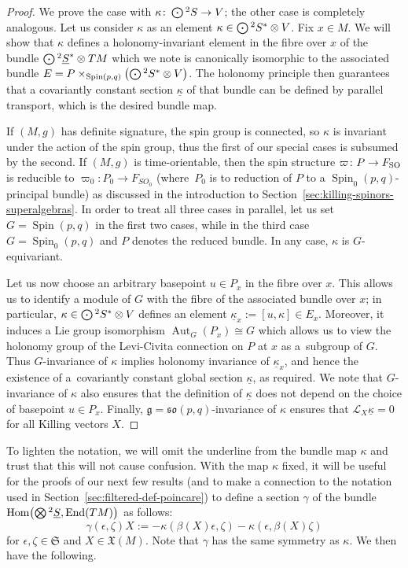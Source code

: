 \documentclass[pdftex]{sigma}
\numberwithin{equation}{section}
\newcommand{\fg}{\mathfrak{g}}
\newcommand{\fso}{\mathfrak{so}}
\newcommand{\fX}{\mathfrak{X}}
\newcommand{\fS}{\mathfrak{S}}
\newcommand{\eL}{\mathscr{L}}
\newcommand{\Sbundle}{\underline{S}}
\newcommand{\Odot}{\mathchoice{{\textstyle\bigodot}}{\bigodot}{\bigodot}{\bigodot}}
\newcommand{\Otimes}{\mathchoice{{\textstyle\bigotimes}}{\bigotimes}{\bigotimes}{\bigotimes}}
\newcommand{\1}{\mathbbm{1}}
\DeclareMathOperator{\End}{End}
\DeclareMathOperator{\Hom}{Hom}
\DeclareMathOperator{\Spin}{Spin}
\DeclareMathOperator{\Aut}{Aut}
\begin{document}
\begin{proof}
	We prove the case with $\kappa\colon \Odot^2S\to V$; the other case is completely analogous. Let us consider $\kappa$ as an element $\kappa\in\Odot^2S^*\otimes V$. Fix $x\in M$. We will show that $\kappa$ defines a holonomy-invariant element in the fibre over $x$ of the bundle $\Odot^2\Sbundle^*\otimes TM$ which we note is canonically isomorphic to the associated bundle $E=P\times_{\Spin(p,q)}\bigl(\Odot^2S^*\otimes V\bigr)$. The holonomy principle then guarantees that a covariantly constant section $\underline\kappa$ of that bundle can be defined by parallel transport, which is the desired bundle map.
	
	If $(M,g)$ has definite signature, the spin group is connected, so $\kappa$ is invariant under the action of the spin group, thus the first of our special cases is subsumed by the second. If $(M,g)$ is time-orientable, then the spin structure $\varpi\colon P\to F_{\rm SO}$ is reducible to $\varpi_0\colon P_0\to F_{SO_0}$ (where~$P_0$ is to reduction of $P$ to a $\Spin_0(p,q)$-principal bundle) as discussed in the introduction to Section~\ref{sec:killing-spinors-superalgebras}. In order to treat all three cases in parallel, let us set $G=\Spin(p,q)$ in the first two cases, while in the third case $G=\Spin_0(p,q)$ and $P$ denotes the reduced bundle. In any case, $\kappa$ is $G$-equivariant.
	
	Let us now choose an arbitrary basepoint $u\in P_x$ in the fibre over $x$. This allows us to identify a module of $G$ with the fibre of the associated bundle over $x$; in particular, $\kappa\in\Odot^2S^*\otimes V$ defines an element $\underline\kappa_x:=[u,\kappa]\in E_x$. Moreover, it induces a Lie group isomorphism $\Aut_G(P_x)\cong G$ which allows us to view the holonomy group of the Levi-Civita connection on $P$ at $x$ as a~subgroup of $G$. Thus $G$-invariance of $\kappa$ implies holonomy invariance of $\underline\kappa_x$, and hence the existence of a~covariantly constant global section $\underline\kappa$, as required. We note that $G$-invariance of $\kappa$ also ensures that the definition of $\underline\kappa$ does not depend on the choice of basepoint $u\in P_x$. Finally, $\fg=\fso(p,q)$-invariance of $\kappa$ ensures that $\eL_X\underline\kappa=0$ for all Killing vectors $X$.
\end{proof}

To lighten the notation, we will omit the underline from the bundle map $\kappa$ and trust that this will not cause confusion. With the map $\kappa$ fixed, it will be useful for the proofs of our next few results (and to make a connection to the notation used in Section~\ref{sec:filtered-def-poincare}) to define a section $\gamma$ of the bundle $\Hom\bigl(\Otimes^2\Sbundle,\End(TM)\bigr)$ as follows:
\begin{equation}\label{eq:gamma-geom-def}
	\gamma(\epsilon,\zeta)X := - \kappa(\beta(X)\epsilon,\zeta) - \kappa(\epsilon,\beta(X)\zeta)
\end{equation}
for $\epsilon,\zeta\in\fS$ and $X\in\fX(M)$. Note that $\gamma$ has the same symmetry as $\kappa$. We then have the following.
\end{document}
